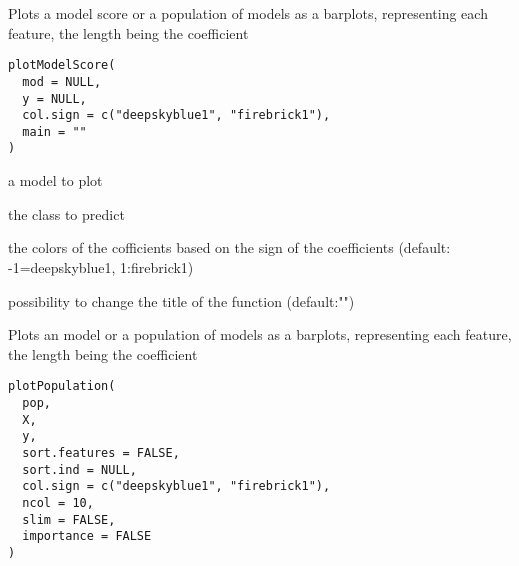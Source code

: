 \documentclass[a4paper]{book}
\begin{document}
%
\begin{Description}
Plots a model score or a population of models as a barplots, representing each feature, the length being the coefficient
\end{Description}
%
\begin{Usage}
\begin{verbatim}
plotModelScore(
  mod = NULL,
  y = NULL,
  col.sign = c("deepskyblue1", "firebrick1"),
  main = ""
)
\end{verbatim}
\end{Usage}
%
\begin{Arguments}
\begin{ldescription}
\item[\code{mod:}] a model to plot

\item[\code{y:}] the class to predict

\item[\code{col.sign:}] the colors of the cofficients based on the sign of the coefficients (default: -1=deepskyblue1, 1:firebrick1)

\item[\code{main:}] possibility to change the title of the function (default:"")
\end{ldescription}
\end{Arguments}
%
\begin{Description}
Plots an model or a population of models as a barplots, representing each feature, the length being the coefficient
\end{Description}
%
\begin{Usage}
\begin{verbatim}
plotPopulation(
  pop,
  X,
  y,
  sort.features = FALSE,
  sort.ind = NULL,
  col.sign = c("deepskyblue1", "firebrick1"),
  ncol = 10,
  slim = FALSE,
  importance = FALSE
)
\end{verbatim}
\end{Usage}
%
\end{document}
